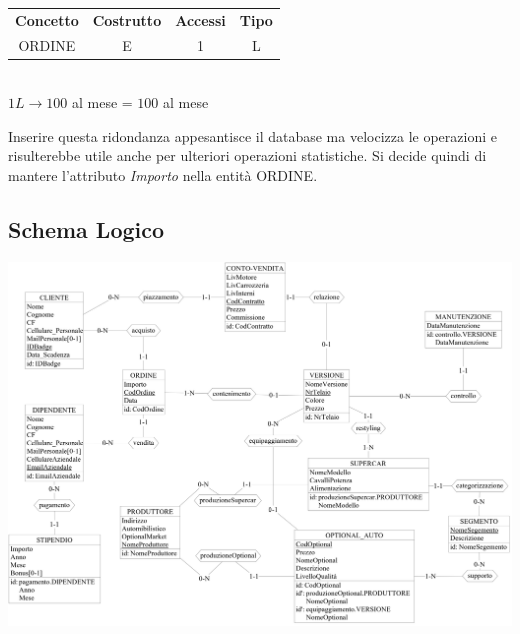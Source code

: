 \documentclass[11pt]{article}
\begin{document}
\begin{table}[H]
    \centering
    \begin{tabular}{c c c c}
        \rowcolor{red!20!}
        \textbf{Concetto} & \textbf{Costrutto} & \textbf{Accessi} &
        \textbf{Tipo}\\
        ORDINE & E & 1 & L \\
    \end{tabular}\\
    \( 1L \rightarrow 100 \) al mese = \( 100 \) al mese
\end{table}

Inserire questa ridondanza appesantisce il database ma velocizza le operazioni e
risulterebbe utile anche per ulteriori operazioni statistiche. 
Si decide quindi di mantere l'attributo \textit{Importo} nella entità ORDINE.

\newpage

\subsection{Schema Logico}

\begin{center}
    \includegraphics[height=\linewidth, angle=90]{images/fullSchemes/logico.jpeg}
\end{center}
\end{document}
